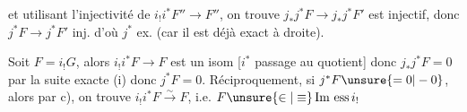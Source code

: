 et utilisant l'injectivité de $i_!i^*F''\to F''$, on trouve $j_*j^*F\to j_*j^*F'$ est injectif, donc $j^*F\to j^*F'$ inj. d'où $j^*$ ex. (car il est déjà exact à droite).

Soit $F=i_!G$, alors $i_!i^*F\to F$ est un isom [$i^*$ passage au quotient] donc $j_*j^*F=0$  par la suite exacte (i) donc $j^*F=0$. Réciproquement, si $j^*F\unsure{=0|-0}$, alors par c), on trouve $i_!i^*F\xrightarrow{\sim}F$, i.e. $F\unsure{\in|\equiv}\operatorname{Im}\,\mathrm{ess}\,i_!$


